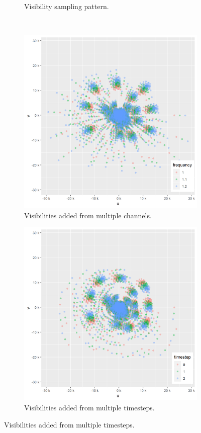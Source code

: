 \begin{figure}[!h]
\begin{subfigure}[b]{0.4\linewidth}
		\caption{Visibility sampling pattern.}
		\label{radio:sampling:pattern}
	\end{subfigure}
	\\
	\begin{subfigure}[b]{0.4\linewidth}
		\includegraphics[width=\linewidth]{./chapters/01.intro/aperture/frequencies.png}
		\caption{Visibilities added from multiple channels.}
		\label{radio:sampling:freq}
	\end{subfigure}
	\begin{subfigure}[b]{0.4\linewidth}
		\includegraphics[width=\linewidth]{./chapters/01.intro/aperture/timesteps.png}
		\caption{Visibilities added from multiple timesteps.}
		\label{radio:sampling:time}
	\end{subfigure}
	

\end{figure}

